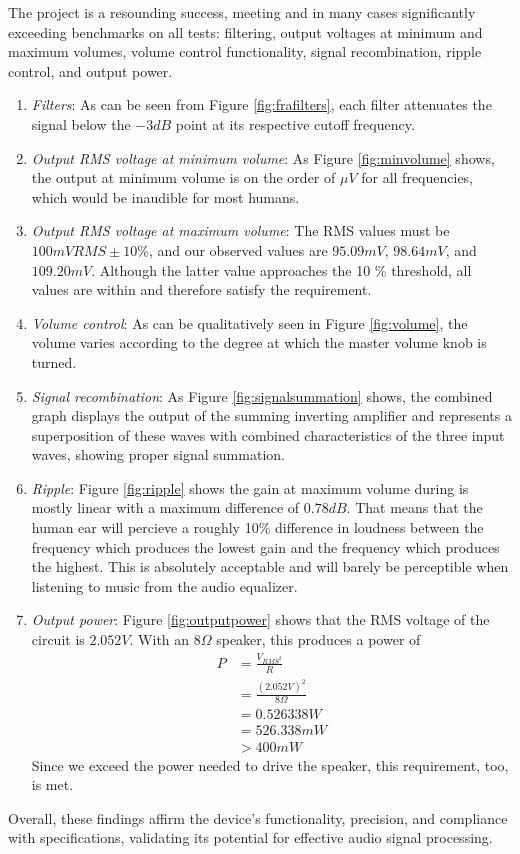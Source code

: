 \documentclass[notitlepage, 12pt]{report}
\begin{document}
The project is a resounding success, meeting and in many cases significantly exceeding benchmarks 
on all tests: filtering, output voltages at minimum and maximum volumes, volume control functionality, 
signal recombination, ripple control, and output power. 
\begin{enumerate}
    \item \emph{Filters}: As can be seen from Figure \ref{fig:frafilters}, each filter 
    attenuates the signal below the $-3dB$ point at its respective cutoff frequency. 
    \item \emph{Output RMS voltage at minimum volume}: As Figure \ref{fig:minvolume} shows, 
    the output at minimum volume is on the order of $\mu V$ for all frequencies, 
    which would be inaudible for most humans. 
    \item \emph{Output RMS voltage at maximum volume}: The RMS values must be $100 mVRMS \pm 10 \%$, 
    and our observed values are $95.09 mV$, $98.64 mV$, 
    and $109.20 mV$. Although the latter value approaches the 10 \% threshold, all values are  
    within and therefore satisfy the requirement. 
    \item \emph{Volume control}: As can be qualitatively seen in Figure \ref{fig:volume}, 
    the volume varies according to the degree at which the master volume knob is turned. 
    \item \emph{Signal recombination}: As Figure \ref{fig:signalsummation} shows, the combined 
    graph displays the output of the summing inverting amplifier and represents a superposition 
    of these waves with combined characteristics of the three input waves, showing proper signal 
    summation. 

    \item \emph{Ripple}: Figure \ref{fig:ripple} shows the gain at maximum volume during is mostly
    linear with a maximum difference of $0.78 dB$. That means 
    that the human ear will percieve a roughly 10\% difference in loudness between the frequency 
    which produces the lowest gain and the frequency which produces the highest. This is 
    absolutely acceptable and will barely be perceptible when listening to music from the 
    audio equalizer. 
    \item \emph{Output power}: Figure \ref{fig:outputpower} shows that the RMS voltage of the circuit 
    is $2.052 V$. With an $8\Omega$ speaker, this produces a power of
    \begin{align*}
        P &= \frac{V_{RMS^2}}{R} \\
        &= \frac{(2.052 V)^2}{8 \Omega} \\
        &= 0.526338 W \\
        &= 526.338 mW \\
        &>400 mW
    \end{align*}
    Since we exceed the power needed to drive the speaker, this requirement, too, is met. 
\end{enumerate}
Overall, these findings affirm the device's functionality, precision, and compliance with specifications, 
validating its potential for effective audio signal processing.
\end{document}

